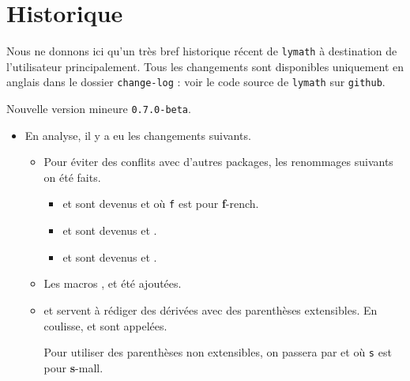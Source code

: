 \documentclass[12pt,a4paper]{article}
\begin{document}
\newpage

\section{Historique}

Nous ne donnons ici qu'un très bref historique récent de \verb+lymath+ à destination de l'utilisateur principalement.
Tous les changements sont disponibles uniquement en anglais dans le dossier \verb+change-log+ : voir le code source de \verb+lymath+ sur \verb+github+.

\begin{description}

    \medskip
    \item[2020-06-08] Nouvelle version mineure \verb+0.7.0-beta+.
    
    \begin{itemize}[itemsep=.5em]
        \item En analyse, il y a eu les changements suivants.
        \begin{itemize}[itemsep=.5em]
            \item Pour éviter des conflits avec d'autres packages, les renommages suivants on été faits.
            \begin{itemize}[itemsep=.5em]
                \item {} et  sont devenus  et  où \verb+f+ est pour \textbf{f}-rench.
    
                \item {} et  sont devenus  et .
    
                \item {} et  sont devenus  et .
            \end{itemize}
    
    		\item Les macros ,  et  été ajoutées.
    
     		\item {} et  servent à rédiger des dérivées avec des parenthèses extensibles. En coulisse,  et  sont appelées.
    
            Pour utiliser des parenthèses non extensibles, on passera par  et  où \verb+s+ est pour \textbf{s}-mall.
    

\end{itemize}
\end{itemize}
\end{description}
\end{document}
